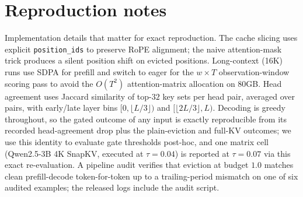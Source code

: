 \documentclass{article}
\begin{document}
\section{Reproduction notes}
\label{app:repro}
Implementation details that matter for exact reproduction. The cache
slicing uses explicit \texttt{position\_ids} to preserve RoPE alignment;
the naive attention-mask trick produces a silent position shift on
evicted positions. Long-context (16K) runs use SDPA for prefill and
switch to eager for the $w \times T$ observation-window scoring pass to
avoid the $O(T^2)$ attention-matrix allocation on 80GB. Head agreement
uses Jaccard similarity of top-$32$ key sets per head pair, averaged
over pairs, with early/late layer bins $[0, \lfloor L/3 \rfloor)$ and
$[\lfloor 2L/3 \rfloor, L)$. Decoding is greedy throughout, so the
gated outcome of any input is exactly reproducible from its recorded
head-agreement drop plus the plain-eviction and full-KV outcomes; we
use this identity to evaluate gate thresholds post-hoc, and one matrix
cell (Qwen2.5-3B 4K SnapKV, executed at $\tau = 0.04$) is reported at
$\tau = 0.07$ via this exact re-evaluation. A pipeline audit verifies
that eviction at budget $1.0$ matches clean prefill-decode
token-for-token up to a trailing-period mismatch on one of six audited
examples; the released logs include the audit script.
\end{document}
